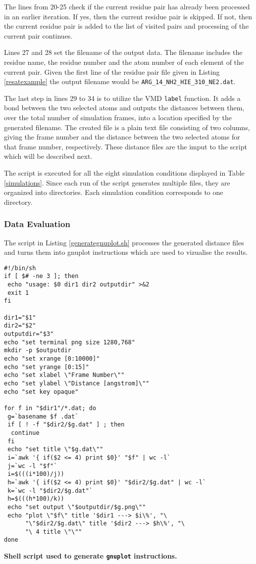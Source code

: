\documentclass[11pt,twocolumn]{article}
\begin{document}
The lines from 20-25 check if the current residue pair has already been processed in an earlier iteration. If yes, then the current residue pair is skipped. If not, then the current residue pair is added to the list of visited pairs and processing of the current pair continues.  

Lines 27 and 28 set the filename of the output data. The filename includes the residue name, the residue number and the atom number of each element of the current pair. Given the first line of the residue pair file given in Listing \ref{resatexample} the output filename would be \texttt{ARG\_14\_NH2\_HIE\_310\_NE2.dat}.

The last step in lines 29 to 34 is to utilize the VMD \texttt{label} function. It adds a bond between the two selected atoms and outputs the distances between them, over the total number of simulation frames, into a location specified by the generated filename. The created file is a plain text file consisting of two columns, giving the frame number and the distance between the two selected atoms for that frame number, respectively. These distance files are the imput to the script which will be described next.

The script is executed for all the eight simulation conditions displayed in Table \ref{simulations}. Since each run of the script generates multiple files, they are organized into directories. Each simulation condition corresponds to one directory.

\subsubsection*{Data Evaluation}

The script in Listing \ref{generategnuplot.sh} processes the generated distance files and turns them into gnuplot instructions which are used to vizualise the results.

\begin{listing}
\begin{verbatim}
#!/bin/sh
if [ $# -ne 3 ]; then 
 echo "usage: $0 dir1 dir2 outputdir" >&2
 exit 1
fi

dir1="$1"
dir2="$2"
outputdir="$3"
echo "set terminal png size 1280,768" 
mkdir -p $outputdir
echo "set xrange [0:10000]"
echo "set yrange [0:15]"
echo "set xlabel \"Frame Number\""
echo "set ylabel \"Distance [angstrom]\""
echo "set key opaque"

for f in "$dir1"/*.dat; do
 g=`basename $f .dat`
 if [ ! -f "$dir2/$g.dat" ] ; then 
  continue
 fi
 echo "set title \"$g.dat\""
 i=`awk '{ if($2 <= 4) print $0}' "$f" | wc -l`
 j=`wc -l "$f"`
 i=$(((i*100)/j))
 h=`awk '{ if($2 <= 4) print $0}' "$dir2/$g.dat" | wc -l`
 k=`wc -l "$dir2/$g.dat"`
 h=$(((h*100)/k))
 echo "set output \"$outputdir/$g.png\""
 echo "plot \"$f\" title '$dir1 ---> $i\%', "\
      "\"$dir2/$g.dat\" title '$dir2 ---> $h\%', "\
      "\ 4 title \"\""
done
\end{verbatim}
\caption{\textbf{Shell script used to generate \texttt{gnuplot} instructions.}}\label{generategnuplot.sh}
\end{listing}
\end{document}
